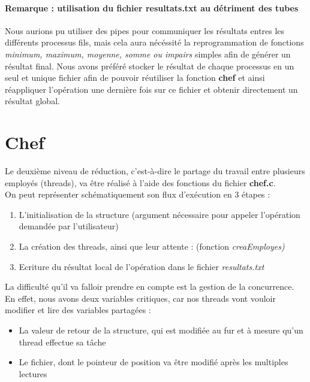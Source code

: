 \documentclass[a4]{article}
\begin{document}
			\paragraph{Remarque : utilisation du fichier resultats.txt au détriment des tubes\\}
			Nous aurions pu utiliser des pipes pour communiquer les résultats entres les différents processus fils, mais cela aura nécéssité la 
			reprogrammation de fonctions \textit{minimum, maximum, moyenne, somme ou impairs} simples afin de générer un résultat final. Nous avons 
			préféré stocker le résultat de chaque processus en un seul et unique fichier afin de pouvoir réutiliser la fonction \textbf{chef} et 
			ainsi réappliquer l'opération une dernière fois sur ce fichier et obtenir directement un résultat global.
			
	\section{Chef}
			Le deuxième niveau de réduction, c'est-à-dire le partage du travail entre plusieurs employés (threads), va être réalisé à l'aide des 
			fonctions du fichier \textbf{chef.c}.\\

			On peut représenter schématiquement son flux d'exécution en 3 étapes :
			\begin{enumerate}
				\item{L'initialisation de la structure (argument nécessaire pour appeler l'opération demandée par l'utilisateur)}
				\item{La création des threads, ainsi que leur attente : (fonction \textit{creaEmployes)}}
				\item{Ecriture du résultat local de l'opération dans le fichier \textit{resultats.txt}}
			\end{enumerate}
			
			La difficulté qu'il va falloir prendre en compte est la gestion de la concurrence.
			En effet, nous avons deux variables critiques, car nos threads vont vouloir modifier et lire des variables partagées :
			\begin{itemize}
				\item{La valeur de retour de la structure, qui est modifiée au fur et à mesure qu'un thread effectue sa tâche}
				\item{Le fichier, dont le pointeur de position va être modifié après les multiples lectures}
			\end{itemize}
\end{document}
